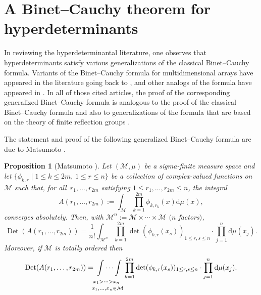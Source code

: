 \documentclass[pdftex]{sigma}
\numberwithin{equation}{section}
\newtheorem{Proposition}[Theorem]{Proposition}
 { \theoremstyle{definition}
\newtheorem{Definition}[Theorem]{Definition}
\newtheorem{Note}[Theorem]{Note}
\newtheorem{Example}[Theorem]{Example}
\newtheorem{Remark}[Theorem]{Remark} }
\def\dd{ \mathrm{d}}
\def\Det{\operatorname{Det}}
\def\mcalM{\mathcal{M}}
\begin{document}
\section{A Binet--Cauchy theorem for hyperdeterminants}
\label{sec_BC_for_hyperdets}

In reviewing the hyperdeterminantal literature, one observes that hyperdeterminants satisfy various generalizations of the classical Binet--Cauchy formula. Variants of the Binet--Cauchy formula for multidimensional arrays have appeared in the literature going back to \cite{gasparyan,hval}, and other analogs of the formula have appeared in \cite{barvinok,boussicault,dionisi,evans,karlinrinott88,matsumoto}. In all of those cited articles, the proof of the corresponding generalized Binet--Cauchy formula is analogous to the proof of the classical Binet--Cauchy formula \cite{Karlin} and also to generalizations of the formula that are based on the theory of finite reflection groups \cite{grossrichards89,grossrichards95}.

The statement and proof of the following generalized Binet--Cauchy formula are due to Matsumoto \cite[Proposition 2.1]{matsumoto}.


\begin{Proposition}[Matsumoto \cite{matsumoto}]
\label{prop_binet_cauchy}
Let $(\mcalM,\mu)$ be a sigma-finite measure space and let $\{\phi_{k,r}\mid\allowbreak 1 \le k \le 2m,\, 1 \le r \le n\}$ be a collection of complex-valued functions on $\mcalM$ such that, for all~${r_1,\dots,r_{2m}}$ satisfying $1 \le r_1,\dots,r_{2m} \le n$, the integral
\begin{equation}
A(r_1,\dots,r_{2m}) := \int_\mcalM \prod_{k=1}^{2m} \phi_{k,r_k}(x) \dd\mu(x),\label{BCkernel}
\end{equation}
converges absolutely. Then, with $\mcalM^n := \mcalM \times \cdots \times \mcalM$ $(n$ factors$)$,
\begin{equation}
\Det(A(r_1,\dots,r_{2m})) = \frac{1}{n!} \int_{\mcalM^n} \prod_{k=1}^{2m} \det(\phi_{k,r}(x_s))_{1 \le r,s \le n} \cdot \prod_{j=1}^n \dd\mu(x_j).\label{binetcauchy1}
\end{equation}
Moreover, if $\mcalM$ is totally ordered then
\begin{equation}
\Det(A(r_1,\dots,r_{2m})) = \idotsint\limits_{\substack{x_1 > \cdots > x_n {\phantom{\big|}}\\ x_1,\dots,x_n \in \mcalM}} \prod_{k=1}^{2m} \det(\phi_{k,r}(x_s))_{1 \le r,s \le n} \cdot \prod_{j=1}^n \dd\mu(x_j).\label{binetcauchy2}
\end{equation}
\end{Proposition}
\end{document}
